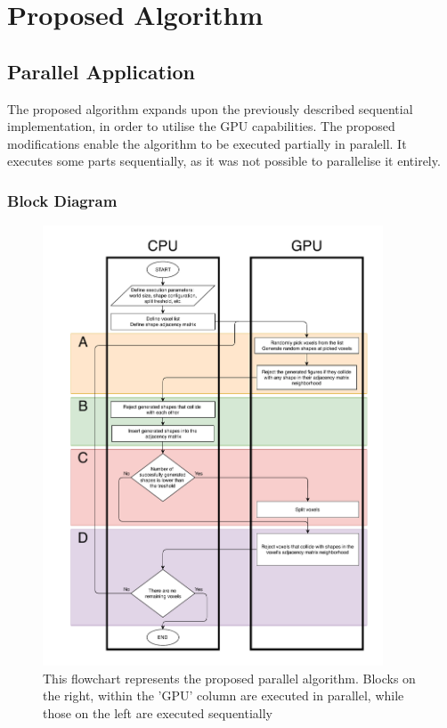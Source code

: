 \documentclass[12pt, oneside]{report}
\begin{document}
\chapter{Proposed Algorithm}

\section {Parallel Application}
The proposed algorithm expands upon the previously described sequential implementation, in order to utilise the GPU capabilities. The proposed modifications enable the algorithm to be executed partially in paralell. It executes some parts sequentially, as it was not possible to parallelise it entirely.

\subsection{Block Diagram}

\begin{figure}[H]
  \centering
	\includegraphics[width=0.9\textwidth,height=0.9\textheight,keepaspectratio]{Images/GPURSA/GPUDiagram1.pdf}
	\caption{This flowchart represents the proposed parallel algorithm. \newline
		Blocks on the right, within the 'GPU' column are executed in parallel, while those on the left are executed sequentially}
	\label{GPURSABlockDiagramPdf}
\end{figure}
\end{document}
